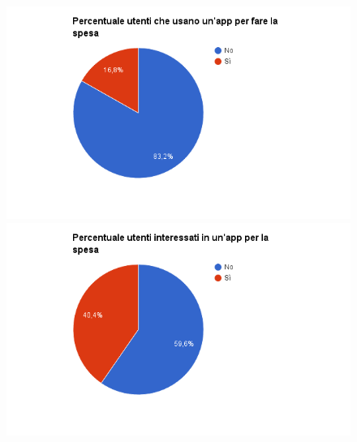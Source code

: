 \begin{figure}[H]
\centering
\begin{minipage}{.48\textwidth}
	\includegraphics[scale=0.45]{img/chart_usi_app_spesa}
\end{minipage}
\hfill
\begin{minipage}{.49\textwidth}
	\includegraphics[scale=0.45]{img/chart_vorresti_app_spesa}
\end{minipage}
\end{figure}

